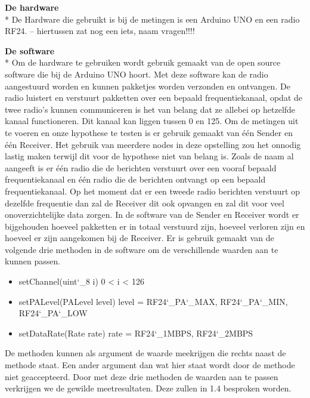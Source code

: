 \documentclass{article}
\begin{document}
\textbf{De hardware}\\*
\setlength{\parskip}{10pt plus 1pt minus 1pt}
De Hardware die gebruikt is bij de metingen is een Arduino UNO en een radio RF24. -- hiertussen zat nog een iets, naam vragen!!!!

\textbf{ De software}\\*
Om de hardware te gebruiken wordt gebruik gemaakt van de open source software die bij de Arduino UNO hoort. Met deze software kan de radio aangestuurd worden en kunnen pakketjes worden verzonden en ontvangen. De radio luistert en verstuurt pakketten over een bepaald frequentiekanaal, opdat de twee radio's kunnen communiceren is het van belang dat ze allebei op hetzelfde kanaal functioneren. Dit kanaal kan liggen tussen 0 en 125. Om de metingen uit te voeren en onze hypothese te testen is er gebruik gemaakt van \'{e}\'{e}n Sender en \'{e}\'{e}n Receiver. Het gebruik van meerdere nodes in deze opstelling zou het onnodig lastig maken terwijl dit voor de hypothese niet van belang is. Zoals de naam al aangeeft is er \'{e}\'{e}n radio die de berichten verstuurt over een vooraf bepaald frequentiekanaal en \'{e}\'{e}n radio die de berichten ontvangt op een bepaald frequentiekanaal. Op het moment dat er een tweede radio berichten verstuurt op dezelfde frequentie dan zal de Receiver dit ook opvangen en zal dit voor veel onoverzichtelijke data zorgen. In de software van de Sender en Receiver wordt er bijgehouden hoeveel pakketten er in totaal verstuurd zijn, hoeveel verloren zijn en hoeveel er zijn aangekomen bij de Receiver. Er is gebruik gemaakt van de volgende drie methoden in de software om de verschillende waarden aan te kunnen passen. 
\begin{itemize}
	\item setChannel(uint\char`_8 i)  0 < i < 126
	\item setPALevel(PALevel level) level = RF24\char`_PA\char`_MAX, RF24\char`_PA\char`_MIN, RF24\char`_PA\char`_LOW 
	\item setDataRate(Rate rate) rate = RF24\char`_1MBPS, RF24\char`_2MBPS
\end{itemize}
De methoden kunnen als argument de waarde meekrijgen die rechts naast de methode staat. Een ander argument dan wat hier staat wordt door de methode niet geaccepteerd. 
Door met deze drie methoden de waarden aan te passen verkrijgen we de gewilde meetresultaten. Deze zullen in 1.4 besproken worden.
\end{document}
